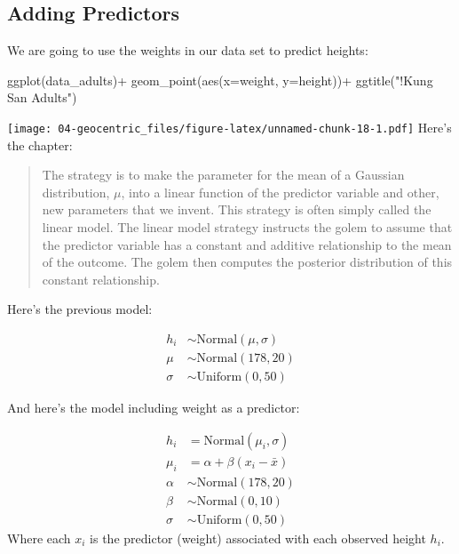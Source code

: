 \documentclass[
]{book}
\newenvironment{Shaded}{\begin{snugshade}}{\end{snugshade}}
\newcommand{\AttributeTok}[1]{\textcolor[rgb]{0.77,0.63,0.00}{#1}}
\newcommand{\FunctionTok}[1]{\textcolor[rgb]{0.00,0.00,0.00}{#1}}
\newcommand{\NormalTok}[1]{#1}
\newcommand{\SpecialCharTok}[1]{\textcolor[rgb]{0.00,0.00,0.00}{#1}}
\newcommand{\StringTok}[1]{\textcolor[rgb]{0.31,0.60,0.02}{#1}}
\begin{document}
\hypertarget{adding-predictors}{%
\subsection{Adding Predictors}\label{adding-predictors}}

We are going to use the weights in our data set to predict heights:

\begin{Shaded}
\begin{Highlighting}[]
\FunctionTok{ggplot}\NormalTok{(data\_adults)}\SpecialCharTok{+}
  \FunctionTok{geom\_point}\NormalTok{(}\FunctionTok{aes}\NormalTok{(}\AttributeTok{x=}\NormalTok{weight, }\AttributeTok{y=}\NormalTok{height))}\SpecialCharTok{+}
  \FunctionTok{ggtitle}\NormalTok{(}\StringTok{"!Kung San Adults"}\NormalTok{)}
\end{Highlighting}
\end{Shaded}

\texttt{[image: 04-geocentric\_files/figure-latex/unnamed-chunk-18-1.pdf]}
Here's the chapter:

\begin{quote}
The strategy is to make the parameter for the mean of a Gaussian distribution, \(\mu\), into a linear function of the predictor variable and other, new parameters that we invent. This strategy is often simply called the linear model. The linear model strategy instructs the golem to assume that the predictor variable has a constant and additive relationship to the mean of the outcome. The golem then computes the posterior distribution of this constant relationship.
\end{quote}

Here's the previous model:

\[
\begin{aligned}
h_i &\sim \text{Normal}(\mu, \sigma)\\
\mu &\sim \text{Normal}(178, 20) \\
\sigma &\sim \text{Uniform}(0,50)
\end{aligned}
\]

And here's the model including weight as a predictor:

\[
\begin{aligned}
h_i &= \text{Normal}(\mu_i, \sigma)\\
\mu_i &= \alpha + \beta(x_i - \bar{x}) \\
\alpha &\sim \text{Normal}(178, 20) \\
\beta &\sim \text{Normal}(0, 10) \\
\sigma &\sim \text{Uniform}(0,50)
\end{aligned}
\]
Where each \(x_i\) is the predictor (weight) associated with each observed height \(h_i\).
\end{document}
